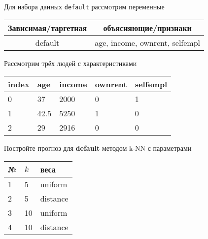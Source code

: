 \begin{exercise}
Для набора данных \texttt{default} рассмотрим переменные
\begin{center}
	\begin{tabular}{|c|c|} \hline
		Зависимая/таргетная & объясняющие/признаки \\ \hline
		default & age, income, ownrent, selfempl \\ \hline
	\end{tabular}
\end{center}
Рассмотрим трёх людей с характеристиками
	\begin{center}
		\begin{tabular}{|l||l|l|l|l|}\hline
			index & age & income & ownrent & selfempl  \\ \hline\hline
			0 & 37 & 2000 & 0 & 1  \\
			1 & 42.5 & 5250 & 1 & 0  \\
			2 & 29 & 2916 & 0 & 0  \\ \hline
		\end{tabular}
	\end{center}
Постройте прогноз для \textbf{default} методом k-NN с параметрами
\begin{center}
	\begin{tabular}{|l|l|l|}\hline
	№ & \(k\) & веса \\ \hline
	1 & 5 & uniform \\
	2 & 5 & distance \\
	3 & 10 & uniform \\
	4 & 10 & distance \\ \hline
	\end{tabular}
\end{center}
\end{exercise}
